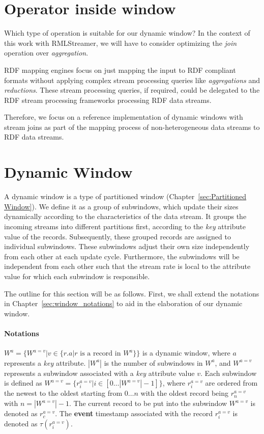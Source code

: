 \section{Operator inside window}
\label{sec:Operator inside window}
Which type of operation is suitable for our dynamic window? 
In the context of this work with RMLStreamer, we will have to consider optimizing the 
\emph{join} operation over \emph{aggregation}. 

RDF mapping engines focus 
on just mapping the input to RDF compliant formats without 
applying complex stream processing queries like \emph{aggregations} and 
\emph{reductions}. These stream processing queries, if required, could be 
delegated to the RDF stream processing frameworks processing RDF data streams.

Therefore, we focus on a reference implementation of dynamic windows with 
stream joins as part of the mapping process of non-heterogeneous data streams 
to RDF data streams. 


\section{Dynamic Window}%
\label{sec:Dynamic Window}
A dynamic window is a type of partitioned window (Chapter~\ref{sec:Partitioned Window}).
We define it as a group of subwindows, which update their sizes dynamically according to the characteristics 
of the data stream. It groups the incoming streams into different partitions first, according to 
the \emph{key} attribute value of the records. Subsequently, these grouped records are assigned 
to individual subwindows. These subwindows adjust their own size independently from each other 
at each update cycle. Furthermore, the subwindows will be independent from each other such 
that the stream rate is local to the attribute value for which each subwindow is responsible. 

The outline for this section will be as follows. 
First, we shall extend the notations in Chapter~\ref{sec:window_notations} to aid in the 
elaboration of our dynamic window.


\paragraph{Notations}
$W^{a} = \{ W^{a=v} | v \in \{r.a | r \text{ is a record in } W^a\}\}$ is a dynamic window, 
where $a$ represents a \emph{key} attribute. $|W^a|$ is the number of subwindows 
in $W^a$, and $W^{a=v}$ represents a subwindow associated with a \emph{key} attribute value 
$v$. Each subwindow is defined as $W^{a=v} = \{r_{i}^{a=v} | i \in [0\dots|W^{a=v}|-1]\}$, 
where $r_{i}^{a=v}$ are ordered from the newest to the oldest starting from 
$0\dots n$ with the oldest record being $r_{n}^{a=v}$ with $n = |W^{a=v}|-1$. 
The current record to be put into the subwindow $W^{a=v}$ is denoted as $r_{c}^{a=v}$. 
The \textbf{event} timestamp associated with the record $r_{i}^{a=v}$ is denoted as 
$\tau(r_{i}^{a=v})$. 

